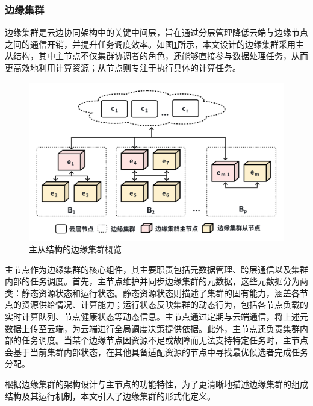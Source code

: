 \subsubsection{边缘集群}

边缘集群是云边协同架构中的关键中间层，旨在通过分层管理降低云端与边缘节点之间的通信开销，并提升任务调度效率。如图\ref{fig:3-5edgecluster}所示，本文设计的边缘集群采用主从结构，其中主节点不仅集群协调者的角色，还能够直接参与数据处理任务，从而更高效地利用计算资源；从节点则专注于执行具体的计算任务。

\begin{figure}[h]
  \centering
  \includegraphics[width=0.8\linewidth]{pics/3-5边缘集群.png}
  \caption{主从结构的边缘集群概览}
  \label{fig:3-5edgecluster}
\end{figure}

主节点作为边缘集群的核心组件，其主要职责包括元数据管理、跨层通信以及集群内部的任务调度。首先，主节点维护并同步边缘集群的元数据，这些元数据分为两类：静态资源状态和运行状态。静态资源状态则描述了集群的固有能力，涵盖各节点的资源供给情况、计算能力；运行状态反映集群的动态行为，包括各节点负载的实时计算队列、节点健康状态等动态信息。主节点通过定期与云端通信，将上述元数据上传至云端，为云端进行全局调度决策提供依据。此外，主节点还负责集群内部的任务调度。当某个边缘节点因资源不足或故障而无法支持特定任务时，主节点会基于当前集群内部状态，在其他具备适配资源的节点中寻找最优候选者完成任务分配。

根据边缘集群的架构设计与主节点的功能特性，为了更清晰地描述边缘集群的组成结构及其运行机制，本文引入了边缘集群的形式化定义。

